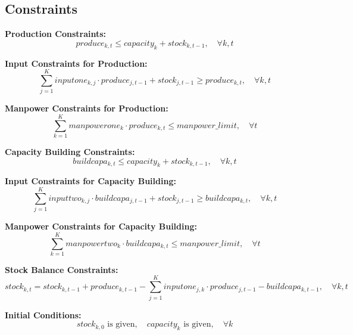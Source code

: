 \documentclass{article}
\begin{document}
\subsection*{Constraints}

\textbf{Production Constraints:}
\[
produce_{k,t} \leq capacity_{k} + stock_{k,t-1}, \quad \forall k, t
\]

\textbf{Input Constraints for Production:}
\[
\sum_{j=1}^{K} inputone_{k,j} \cdot produce_{j,t-1} + stock_{j,t-1} \geq produce_{k,t}, \quad \forall k, t
\]

\textbf{Manpower Constraints for Production:}
\[
\sum_{k=1}^{K} manpowerone_{k} \cdot produce_{k,t} \leq manpower\_limit, \quad \forall t
\]

\textbf{Capacity Building Constraints:}
\[
buildcapa_{k,t} \leq capacity_{k} + stock_{k,t-1}, \quad \forall k, t
\]

\textbf{Input Constraints for Capacity Building:}
\[
\sum_{j=1}^{K} inputtwo_{k,j} \cdot buildcapa_{j,t-1} + stock_{j,t-1} \geq buildcapa_{k,t}, \quad \forall k, t
\]

\textbf{Manpower Constraints for Capacity Building:}
\[
\sum_{k=1}^{K} manpowertwo_{k} \cdot buildcapa_{k,t} \leq manpower\_limit, \quad \forall t
\]

\textbf{Stock Balance Constraints:}
\[
stock_{k,t} = stock_{k,t-1} + produce_{k,t-1} - \sum_{j=1}^{K} inputone_{j,k} \cdot produce_{j,t-1} - buildcapa_{k,t-1}, \quad \forall k, t
\]

\textbf{Initial Conditions:}
\[
stock_{k,0} \text{ is given}, \quad capacity_{k} \text{ is given}, \quad \forall k
\]
\end{document}
